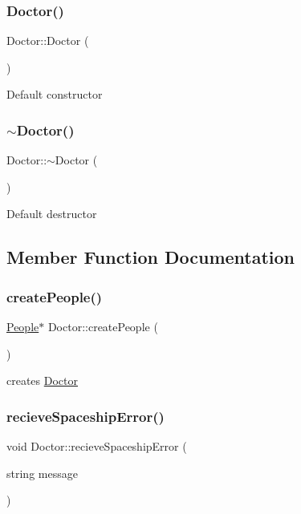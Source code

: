 \subsubsection{\texorpdfstring{Doctor()}{Doctor()}}
{\footnotesize\ttfamily Doctor\+::\+Doctor (\begin{DoxyParamCaption}{ }\end{DoxyParamCaption})\hspace{0.3cm}{\ttfamily [inline]}}

Default constructor \mbox{\label{classDoctor_a1481ccfafebc7a2424d3659a0223ebfe}} 
\subsubsection{\texorpdfstring{$\sim$\+Doctor()}{~Doctor()}}
{\footnotesize\ttfamily Doctor\+::$\sim$\+Doctor (\begin{DoxyParamCaption}{ }\end{DoxyParamCaption})\hspace{0.3cm}{\ttfamily [inline]}}

Default destructor 

\subsection{Member Function Documentation}
\mbox{\label{classDoctor_a684a580014991a9193d0021796041ff5}} 
\subsubsection{\texorpdfstring{create\+People()}{createPeople()}}
{\footnotesize\ttfamily \hyperlink{classPeople}{People}$\ast$ Doctor\+::create\+People (\begin{DoxyParamCaption}{ }\end{DoxyParamCaption})}

creates \hyperlink{classDoctor}{Doctor} \mbox{\label{classDoctor_a820dca3b9f05d3f69c47bd7318923b88}} 
\subsubsection{\texorpdfstring{recieve\+Spaceship\+Error()}{recieveSpaceshipError()}}
{\footnotesize\ttfamily void Doctor\+::recieve\+Spaceship\+Error (\begin{DoxyParamCaption}\item[{string}]{message }\end{DoxyParamCaption})\hspace{0.3cm}{\ttfamily [virtual]}}

